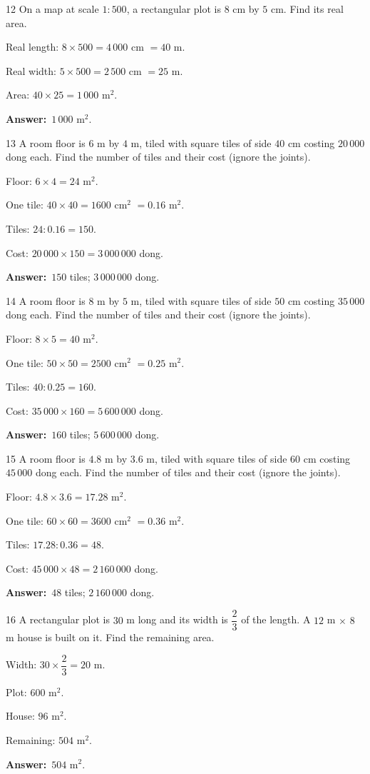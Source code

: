 \documentclass[11pt]{article}
\newif\ifsol \solfalse
\providecommand{\AnsWord}{Đáp số}
\newcommand{\dapso}[1]{\par\textbf{\AnsWord:}\ #1}
\newcommand{\probsol}[1]{%
  \begin{lrbox}{\solmeasure}\begin{minipage}{\dimexpr\linewidth-24pt\relax}#1\end{minipage}\end{lrbox}%
  \ifsol
    \begin{solbox}#1\end{solbox}%
  \else
    \setlength{\solht}{\dimexpr\ht\solmeasure+\dp\solmeasure+0.85cm\relax}%
    \ifdim\solht<1.35cm\setlength{\solht}{1.35cm}\fi
    \begin{tcolorbox}[colback=white,colframe=Line,boxrule=0.8pt,arc=5pt,
      left=8pt,right=8pt,top=4pt,bottom=4pt,height=\solht]{\footnotesize\color{Slate}\itshape\WorkWord}\end{tcolorbox}%
  \fi}
\newcommand{\gap}{\vspace{0.3cm}}
\def\WorkWord{Your work:}
\def\AnsWord{Answer}
\begin{document}
\gap
\begin{probbox}{12}{\relax}
On a map at scale $1:500$, a rectangular plot is $8$ cm by $5$ cm. Find its real area.
\end{probbox}
\probsol{
Real length: $8\times500=4\,000$ cm $=40$ m.\par Real width: $5\times500=2\,500$ cm $=25$ m.\par Area: $40\times25=1\,000$ m$^2$.
\dapso{$1\,000$ m$^2$.}}
\gap
\begin{probbox}{13}{\relax}
A room floor is $6$ m by $4$ m, tiled with square tiles of side $40$ cm costing $20\,000$ dong each. Find the number of tiles and their cost (ignore the joints).
\end{probbox}
\probsol{
Floor: $6\times4=24$ m$^2$.\par One tile: $40\times40=1600$ cm$^2$ $=0.16$ m$^2$.\par Tiles: $24:0.16=150$.\par Cost: $20\,000\times150=3\,000\,000$ dong.
\dapso{$150$ tiles; $3\,000\,000$ dong.}}
\gap
\begin{probbox}{14}{\relax}
A room floor is $8$ m by $5$ m, tiled with square tiles of side $50$ cm costing $35\,000$ dong each. Find the number of tiles and their cost (ignore the joints).
\end{probbox}
\probsol{
Floor: $8\times5=40$ m$^2$.\par One tile: $50\times50=2500$ cm$^2$ $=0.25$ m$^2$.\par Tiles: $40:0.25=160$.\par Cost: $35\,000\times160=5\,600\,000$ dong.
\dapso{$160$ tiles; $5\,600\,000$ dong.}}
\gap
\begin{probbox}{15}{\relax}
A room floor is $4.8$ m by $3.6$ m, tiled with square tiles of side $60$ cm costing $45\,000$ dong each. Find the number of tiles and their cost (ignore the joints).
\end{probbox}
\probsol{
Floor: $4.8\times3.6=17.28$ m$^2$.\par One tile: $60\times60=3600$ cm$^2$ $=0.36$ m$^2$.\par Tiles: $17.28:0.36=48$.\par Cost: $45\,000\times48=2\,160\,000$ dong.
\dapso{$48$ tiles; $2\,160\,000$ dong.}}
\gap
\begin{probbox}{16}{\relax}
A rectangular plot is $30$ m long and its width is $\dfrac{2}{3}$ of the length. A $12$ m $\times$ $8$ m house is built on it. Find the remaining area.
\end{probbox}
\probsol{
Width: $30\times\dfrac{2}{3}=20$ m.\par Plot: $600$ m$^2$.\par House: $96$ m$^2$.\par Remaining: $504$ m$^2$.
\dapso{$504$ m$^2$.}}
\end{document}
